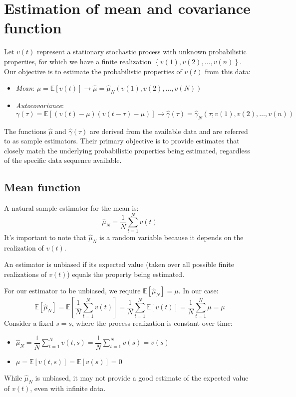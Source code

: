 \section{Estimation of mean and covariance function}

Let $v(t)$ represent a stationary stochastic process with unknown probabilistic properties, for which we have a finite realization $\left\{ v(1),v(2),\dots,v(n) \right\}$. 
Our objective is to estimate the probabilistic properties of $v(t)$ from this data:
\begin{itemize}
    \item \textit{Mean}: $\mu=\mathbb{E}\left[ v(t) \right]\rightarrow\widehat{\mu}=\widehat{\mu}_N\left( v(1),v(2),\dots,v(N) \right)$
    \item \textit{Autocovariance}: $\gamma(\tau)=\mathbb{E}\left[\left(v(t)-\mu\right)\left(v(t-\tau)-\mu\right)\right] \rightarrow \widehat{\gamma}(\tau)=\widehat{\gamma}_N\left(\tau;v(1),v(2),\dots,v(n)\right)$
\end{itemize}
The functions $\widehat{\mu}$ and $\widehat{\gamma}(\tau)$ are derived from the available data and are referred to as sample estimators.
Their primary objective is to provide estimates that closely match the underlying probabilistic properties being estimated, regardless of the specific data sequence available.

\subsection{Mean function}
A natural sample estimator for the mean is:
\[\widehat{\mu}_N=\dfrac{1}{N}\sum_{t=1}^Nv(t)\]
It's important to note that $\widehat{\mu}_N$ is a random variable because it depends on the realization of  $v(t)$. 
\begin{definition}
    An estimator is unbiased if its expected value (taken over all possible finite realizations of $v(t)$) equals the property being estimated.
\end{definition}
For our estimator to be unbiased, we require $\mathbb{E}\left[ \widehat{\mu}_N \right]=\mu$. 
In our case:
\[\mathbb{E}\left[ \widehat{\mu}_N \right]=\mathbb{E}\left[ \dfrac{1}{N}\sum_{t=1}^Nv(t) \right]=\dfrac{1}{N}\sum_{t=1}^N\mathbb{E}\left[ v(t) \right]=\dfrac{1}{N}\sum_{t=1}^N \mu =\mu\]
Consider a fixed $s = \bar{s}$, where the process realization is constant over time:
\begin{itemize}
    \item $\widehat{\mu}_N=\dfrac{1}{N}\sum_{t=1}^Nv(t,\bar{s})=\dfrac{1}{N}\sum_{t=1}^Nv(\bar{s})=v(\bar{s})$
    \item $\mu=\mathbb{E}\left[v(t,s)\right]=\mathbb{E}\left[v(s)\right]=0$
\end{itemize}
While $\widehat{\mu}_N$  is unbiased, it may not provide a good estimate of the expected value of $v(t)$, even with infinite data.


